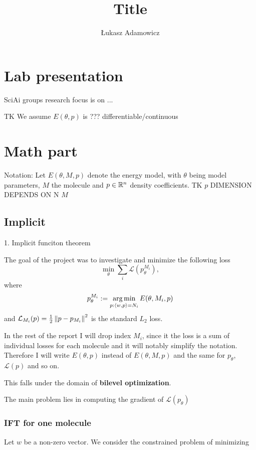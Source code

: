 \documentclass[a4paper,10pt]{report}
\title{Title}
\author{Łukasz Adamowicz}
\begin{document}
\maketitle

\begin{abstract}
\end{abstract}



\section{ Lab presentation}
SciAi groups research focus is on ...

TK
We assume $E(\theta, p)$ is ??? differentiable/continuous

 \section{Math part}
Notation: Let $E(\theta, M ,p)$ denote the energy model, with $\theta$ being model parameters, $M$ the molecule and $p\in \mathbb{R}^n$ density coefficients.
TK $p$ DIMENSION DEPENDS ON N $M$

 \subsection{Implicit}
1. Implicit funciton theorem

The goal of the project was to investigate and minimize the following loss
\begin{equation}
 \min_\theta \sum_i \mathcal{L}(p_{\theta}^{M_i}),
\end{equation}
where
\begin{equation}
  p_\theta^{M_i}:=\operatorname*{arg\,min}_{p : \langle w, p \rangle=N_i} E(\theta,M_i,p)
\end{equation}
and $\mathcal{L}_{M_i}(p) = \frac{1}{2}\left\|p-p_{M_i}\right\|^2$ is the standard $L_2$ loss.

In the rest of the report I will drop index $M_i$, since it the loss is a sum of individual losses for each molecule and it will notably simplify the notation.
Therefore I will write $E(\theta,p)$ instead of $E(\theta,M,p)$ and the same for $p_\theta$, $\mathcal{L}(p)$ and so on.

This falls under the domain of \textbf{bilevel optimization}.

The main problem lies in computing the gradient of $\mathcal{L}(p_\theta)$


\subsubsection{ IFT for one molecule}
Let $w$ be a non-zero vector.
We consider the constrained problem of minimizing
\end{document}
